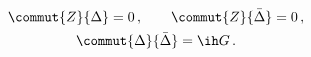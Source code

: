 \begin{equation}
  \begin{gathered}
\label{eq:basic}
    \commut{Z}{\Delta}=0\,,\qquad \commut{Z}{\bar\Delta}=0\,,\\
\commut{\Delta}{\bar\Delta}=\ih G\,.
  \end{gathered}
\end{equation}

